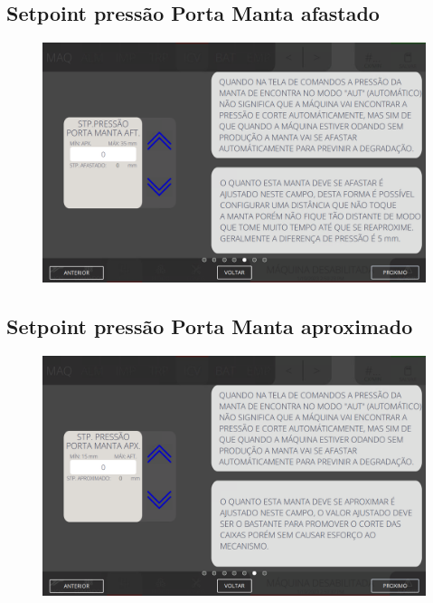 \newpage
\thispagestyle{fancy}
\vspace*{40 pt}
\subsection{Setpoint pressão Porta Manta afastado}
\vspace*{\fill}
\begin{figure}[h]
    \centering
    \includegraphics[width=480 px,height=300 px]{src/imagesICV/06-dryCutter/settings/e-5ERRO.png}
\end{figure}
\vspace*{\fill}

\newpage
\thispagestyle{fancy}
\vspace*{40 pt}
\subsection{Setpoint pressão Porta Manta aproximado}
\vspace*{\fill}
\begin{figure}[h]
    \centering
    \includegraphics[width=576 px,height=360 px]{src/imagesICV/06-dryCutter/settings/e-6.png}
\end{figure}
\vspace*{\fill}

